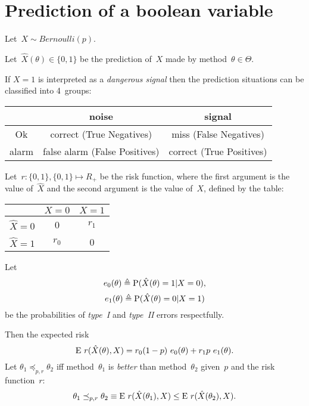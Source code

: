\documentclass[10pt,a4paper]{article}
\theoremstyle{plain} \newtheorem{Lem}{Lemma}
\begin{document}
\section{Prediction of a boolean variable}

Let~$X \sim \mathit{Bernoulli}(p)$.

Let~$\hat X(\theta) \in \{0,1\}$ be the prediction of~$X$ made by method~$\theta \in \Theta$.

If $X=1$ is interpreted as a {\em dangerous signal}
then the prediction situations can be classified into 4~groups:
\begin{center}
\begin{tabular}{|c||c|c|}
\hline       & noise       & signal \\
\hline
\hline Ok    & correct (True Negatives)     & miss  (False Negatives)\\
\hline alarm & false alarm (False Positives)& correct (True Positives) \\
\hline
\end{tabular}
\end{center}

Let~$r : \{0,1\}, \{0,1\} \mapsto R_+$ be the risk function,
where the first  argument is the value of~$\hat X$
and   the second argument is the value of~$X$,
defined by the table:

\begin{center}
\begin{tabular}{|c||c|c|}
\hline              & $X=0$ & $X=1$ \\
\hline
\hline $\hat X = 0$ & 0     & $r_1$ \\
\hline $\hat X = 1$ & $r_0$ & 0 \\
\hline
\end{tabular}
\end{center}

Let
$$e_0(\theta) \triangleq \mathrm P(\hat X(\theta) = 1 | X = 0),$$
$$e_1(\theta) \triangleq \mathrm P(\hat X(\theta) = 0 | X = 1)$$
be the probabilities of {\em type~I} and {\em type~II} errors respectfully.

Then the expected risk
\begin{equation} \label{expectedRisk}
\E r(\hat X(\theta), X) = r_0 (1-p) \ e_0(\theta) + r_1 p \ e_1(\theta).
\end{equation}
Let $\theta_1 \preceq_{p,r} \theta_2$ iff method~$\theta_1$ is {\em better} than method~$\theta_2$ given~$p$ and the risk function~$r$:
$$ \theta_1 \preceq_{p,r} \theta_2 \equiv \mathrm E \  r(\hat X(\theta_1), X) \le \mathrm E \  r(\hat X(\theta_2), X). $$
\end{document}
